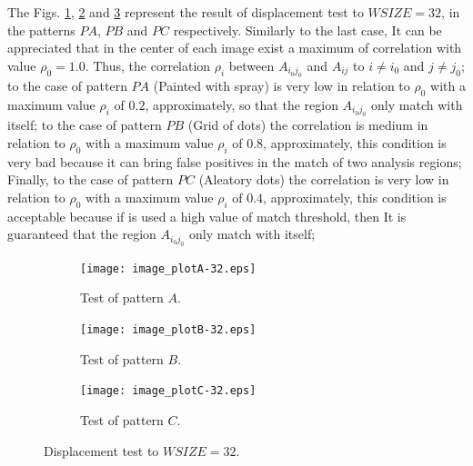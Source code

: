 The Figs. \ref{fig:choosingA32}, \ref{fig:choosingB32} and \ref{fig:choosingC32}
represent the result of displacement test to $WSIZE=32$, 
in the patterns $PA$, $PB$ and $PC$ respectively. Similarly to the last case,
It can be appreciated that in the center of each image exist a maximum of correlation
with value $\rho_0=1.0$. Thus,
the correlation $\rho_i$ between $A_{i_0 j_0}$ and $A_{ij}$ to $i\neq i_0$ and  $j\neq j_0$;
to the case of pattern $PA$ (Painted with spray) is very low in relation to $\rho_0$
with a maximum value $\rho_i$ of $0.2$, approximately, 
so that the region $A_{i_0 j_0}$ only match with itself;
to the case of pattern $PB$ (Grid of dots) the correlation is medium in relation to $\rho_0$
with a maximum value $\rho_i$ of $0.8$, approximately, this condition is 
very bad because it can bring false positives in the match of two analysis regions; Finally,
to the case of pattern $PC$ (Aleatory dots) the correlation is very low in relation to $\rho_0$
with a maximum value $\rho_i$ of $0.4$, approximately, this condition is acceptable
because if is used a high value of match threshold, then It is 
guaranteed that the region $A_{i_0 j_0}$ only match with itself;
\begin{figure}[H]
  \centering
  \begin{subfigure}[b]{0.45\textwidth}
    \texttt{[image: image\_plotA-32.eps]}
    \vspace{2pt}
    \caption{Test of pattern $A$.}
    \label{fig:choosingA32}
  \end{subfigure}
  \begin{subfigure}[b]{0.45\textwidth}
    \texttt{[image: image\_plotB-32.eps]}
    \vspace{2pt}  
    \caption{Test of pattern $B$.}
    \label{fig:choosingB32}
  \end{subfigure}
  \begin{subfigure}[b]{0.45\textwidth}
    \texttt{[image: image\_plotC-32.eps]}
    \vspace{2pt}
    \caption{Test of pattern $C$.}
    \label{fig:choosingC32}
  \end{subfigure}
  \caption{Displacement test to $WSIZE=32$.}
  \label{fig:choosingAll32}
\end{figure}

